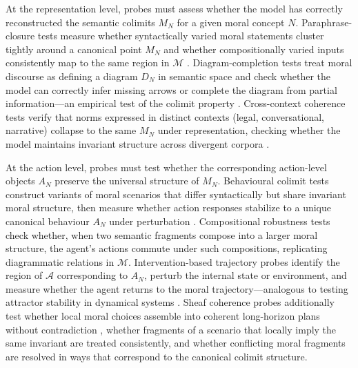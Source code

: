 \documentclass[12pt]{article}
\theoremstyle{definition}
\begin{document}
At the representation level, probes must assess whether the model has correctly
reconstructed the semantic colimits $M_N$ for a given moral concept $N$.
Paraphrase-closure tests measure whether syntactically varied moral statements
cluster tightly around a canonical point $M_N$ and whether compositionally
varied inputs consistently map to the same region in $\mathcal{M}$
\citep{biber2011,Goldberg2006}. Diagram-completion tests treat moral discourse
as defining a diagram $D_N$ in semantic space and check whether the model can
correctly infer missing arrows or complete the diagram from partial
information---an empirical test of the colimit property \citep{spivak2014}.
Cross-context coherence tests verify that norms expressed in distinct contexts
(legal, conversational, narrative) collapse to the same $M_N$ under
representation, checking whether the model maintains invariant structure across
divergent corpora \citep{Tomasello2016}.

At the action level, probes must test whether the corresponding action-level
objects $A_N$ preserve the universal structure of $M_N$. Behavioural colimit
tests construct variants of moral scenarios that differ syntactically but share
invariant moral structure, then measure whether action responses stabilize to a
unique canonical behaviour $A_N$ under perturbation \citep{gabriel2020}.
Compositional robustness tests check whether, when two semantic fragments
compose into a larger moral structure, the agent's actions commute under such
compositions, replicating diagrammatic relations in $\mathcal{M}$.
Intervention-based trajectory probes identify the region of $\mathcal{A}$
corresponding to $A_N$, perturb the internal state or environment, and measure
whether the agent returns to the moral trajectory---analogous to testing
attractor stability in dynamical systems \citep{strogatz2018}. Sheaf coherence
probes additionally test whether local moral choices assemble into coherent
long-horizon plans without contradiction \citep{jacobs2012}, whether fragments
of a scenario that locally imply the same invariant are treated consistently,
and whether conflicting moral fragments are resolved in ways that correspond to
the canonical colimit structure.
\end{document}
